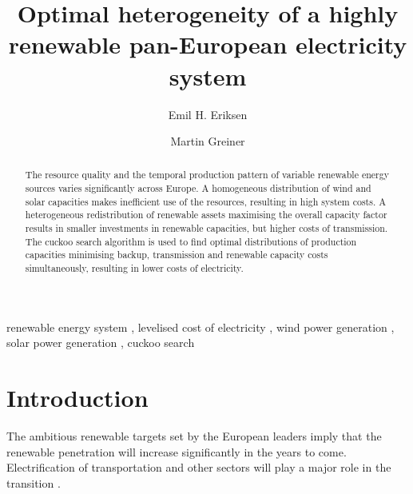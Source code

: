 \documentclass[a4paper, 5p, sort&compress]{elsarticle}%
\begin{document}
\begin{frontmatter}

\title{Optimal heterogeneity of a highly renewable pan-European electricity system}

\author[label1]{Emil H. Eriksen}
\author[label2,label3]{Martin Greiner}
\address[label1]{Department of Physics and Astronomy, Aarhus University, 8000 Aarhus C,  Denmark}
\address[label2]{Department of Mathematics, Aarhus University, 8000 Aarhus C,  Denmark}
\address[label3]{Department of Engineering, Aarhus University, 8200 Aarhus,  Denmark}


\begin{abstract}
  The resource quality and the temporal production pattern of variable
  renewable energy sources varies significantly across Europe. A
  homogeneous distribution of wind and solar capacities makes
  inefficient use of the resources, resulting in high system costs. A
  heterogeneous redistribution of renewable assets maximising the
  overall capacity factor results in smaller investments in renewable
  capacities, but higher costs of transmission. The cuckoo search
  algorithm is used to find optimal distributions of production
  capacities minimising backup, transmission and renewable capacity
  costs simultaneously, resulting in lower costs of electricity.
\end{abstract}

\begin{keyword}
renewable energy system \sep 
levelised cost of electricity \sep
wind power generation \sep
solar power generation \sep
cuckoo search 
\end{keyword}

\end{frontmatter}


\section{Introduction}
\label{sec:one}

The ambitious renewable targets set by the European
leaders \cite{eu2050} imply that the renewable penetration will
increase significantly in the years to come. Electrification of
transportation and other sectors will play a major role in the
transition \cite{Williams12,ecf2050}.
\end{document}
